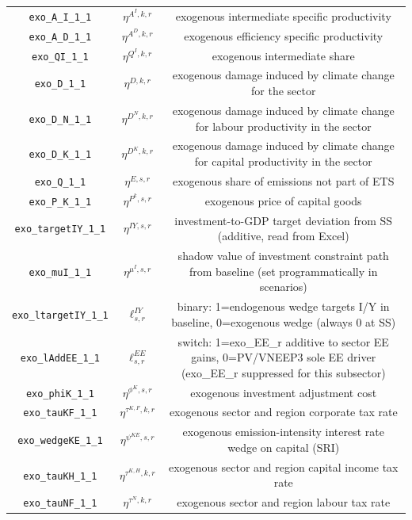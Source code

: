 \begin{center}
\begin{longtable}{ccc}
\texttt{exo\_A\_I\_1\_1} & ${\eta^{A^{I},k,r}}$ & exogenous intermediate specific productivity\\
\texttt{exo\_A\_D\_1\_1} & ${\eta^{A^{D},k,r}}$ & exogenous efficiency specific productivity\\
\texttt{exo\_QI\_1\_1} & ${\eta^{Q^{I},k,r}}$ & exogenous intermediate share\\
\texttt{exo\_D\_1\_1} & ${\eta^{D,k,r}}$ & exogenous damage induced by climate change for the sector\\
\texttt{exo\_D\_N\_1\_1} & ${\eta^{D^{N},k,r}}$ & exogenous damage induced by climate change for labour productivity in the sector\\
\texttt{exo\_D\_K\_1\_1} & ${\eta^{D^{K},k,r}}$ & exogenous damage induced by climate change for capital productivity in the sector\\
\texttt{exo\_Q\_1\_1} & ${\eta^{E,s,r}}$ & exogenous share of emissions not part of ETS\\
\texttt{exo\_P\_K\_1\_1} & ${\eta^{P^k,s,r}}$ & exogenous price of capital goods\\
\texttt{exo\_targetIY\_1\_1} & ${\eta^{IY,s,r}}$ & investment-to-GDP target deviation from SS (additive, read from Excel)\\
\texttt{exo\_muI\_1\_1} & ${\eta^{\mu^{I},s,r}}$ & shadow value of investment constraint path from baseline (set programmatically in scenarios)\\
\texttt{exo\_ltargetIY\_1\_1} & ${\ell^{IY}_{s,r}}$ & binary: 1=endogenous wedge targets I/Y in baseline, 0=exogenous wedge (always 0 at SS)\\
\texttt{exo\_lAddEE\_1\_1} & ${\ell^{EE}_{s,r}}$ & switch: 1=exo\_EE\_r additive to sector EE gains, 0=PV/VNEEP3 sole EE driver (exo\_EE\_r suppressed for this subsector)\\
\texttt{exo\_phiK\_1\_1} & ${\eta^{\phi^{K},{s,r}}}$ & exogenous investment adjustment cost\\
\texttt{exo\_tauKF\_1\_1} & ${\eta^{\tau^{K,F},k,r}}$ & exogenous sector and region corporate tax rate\\
\texttt{exo\_wedgeKE\_1\_1} & ${\eta^{\psi^{KE},s,r}}$ & exogenous emission-intensity interest rate wedge on capital (SRI)\\
\texttt{exo\_tauKH\_1\_1} & ${\eta^{\tau^{K,H},k,r}}$ & exogenous sector and region capital income tax rate\\
\texttt{exo\_tauNF\_1\_1} & ${\eta^{\tau^{N},k,r}}$ & exogenous sector and region labour tax rate\\

\end{longtable}
\end{center}

